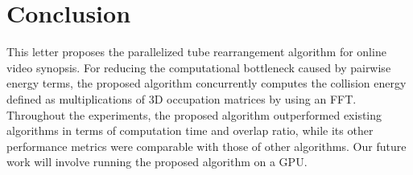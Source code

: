 \documentclass[11pt]{hyu_thesis}
\begin{document}
\section{Conclusion}
\label{sec:conc}
This letter proposes the parallelized tube rearrangement algorithm for online video synopsis. For reducing the computational bottleneck caused by pairwise energy terms, the proposed algorithm concurrently computes the collision energy defined as multiplications of 3D occupation matrices by using an FFT. Throughout the experiments, the proposed algorithm outperformed existing algorithms in terms of computation time and overlap ratio, while its other performance metrics were comparable with those of other algorithms. Our future work will involve running the proposed algorithm on a GPU.



\end{document}
